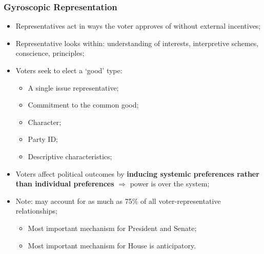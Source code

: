 \documentclass[aspectratio=169]{beamer}
\theoremstyle{principle}
\begin{document}
\begin{frame}
\frametitle{Gyroscopic Representation}
\begin{itemize}
\item Representatives act in ways the voter approves of without external incentives;
\bigskip
\item Representative looks within: understanding of interests, interpretive schemes, conscience, principles;
\bigskip
\item Voters seek to elect a `good' type:
\begin{itemize}
\item A single issue representative;
\item Commitment to the common good;
\item Character;
\item Party ID;
\item Descriptive characteristics;
\end{itemize}
\bigskip
\item Voters affect political outcomes by \textbf{inducing systemic preferences rather than individual preferences} $\Rightarrow$ power is over the system;
\bigskip
\item Note: may account for as much as 75\% of all voter-representative relationships;
\begin{itemize}
\item Most important mechanism for President and Senate;
\item Most important mechanism for House is anticipatory.
\end{itemize}
\end{itemize}

\end{frame}
\end{document}
